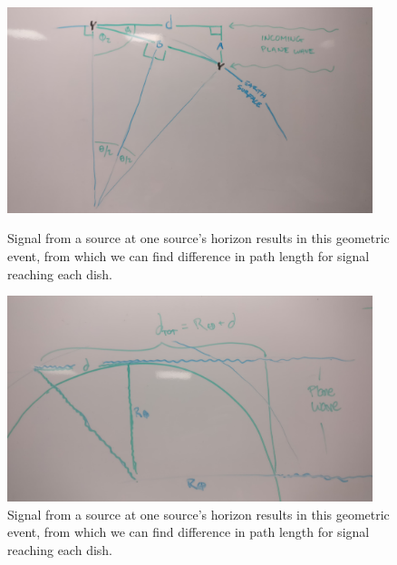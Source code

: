 \documentclass[12pt]{article}
\begin{document}
\begin{onehalfspacing}
\begin{figure}
    \centering
    \begin{minipage}{0.48\textwidth}
        \centering
        \includegraphics[width=0.95\textwidth]{prob1b} %
        \caption{Signal from a source at one source's horizon results in this geometric event, from which we can find difference in path length for signal reaching each dish.}
    \end{minipage}\hfill
    \begin{minipage}{0.48\textwidth}
        \centering
        \includegraphics[width=0.95\textwidth]{prob2b} %
        \caption{Signal from a source at one source's horizon results in this geometric event, from which we can find difference in path length for signal reaching each dish.}
    \end{minipage}
\end{figure}





\end{onehalfspacing}
\end{document}
